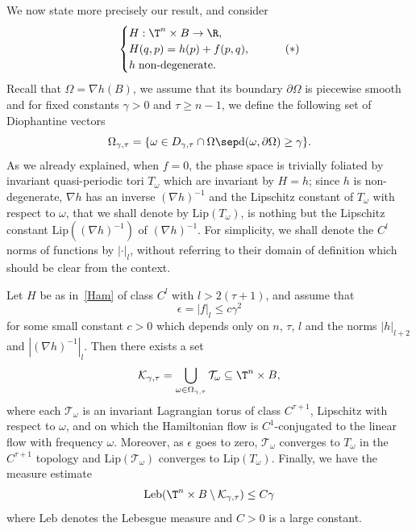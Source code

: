 We now state more precisely our result, and consider
\begin{equation}\label{Ham}
\begin{cases}
H : \T^n \times B \to \R, \\
H(q,p)=h(p)+f(p,q), \\
h \; \mbox{non-degenerate}.
\end{cases}
\tag{$*$}
\end{equation}
Recall that $\Omega=\nabla h(B)$, we assume that its boundary $\partial \Omega$ is piecewise smooth and for fixed constants $\gamma >0$ and $\tau \geq n-1$, we define the following set of Diophantine vectors
\begin{equation*}
\Omega_{\gamma,\tau}=\{\omega \in D_{\gamma,\tau} \cap \Omega \sep \mathrm{d}(\omega,\partial\Omega) \geq \gamma\}.
\end{equation*}
As we already explained, when $f=0$, the phase space is trivially foliated by invariant quasi-periodic tori $T_\omega$ which are invariant by $H=h$; since $h$ is non-degenerate, $\nabla h$ has an inverse $(\nabla h)^{-1}$ and the Lipschitz constant of $T_\omega$ with respect to $\omega$, that we shall denote by $\mathrm{Lip}(T_\omega)$, is nothing but the Lipschitz constant $\mathrm{Lip}((\nabla h)^{-1})$ of $(\nabla h)^{-1}$. For simplicity, we shall denote the $C^l$ norms of functions by $|{\cdot}|_l$, without referring to their domain of definition which should be clear from the context.

\begin{Main}\label{thm1}
Let $H$ be as in~\eqref{Ham} of class $C^l$ with $l>2(\tau+1)$, and assume that
\begin{equation}\label{seuila}
\epsilon=|f|_l \leq c \gamma^2
\end{equation}
for some small constant $c>0$ which depends only on $n$, $\tau$, $l$ and the norms $|h|_{l+2}$ and $|(\nabla h)^{-1}|_{l}$. Then there exists a set
\[ \mathcal{K}_{\gamma,\tau}=\bigcup_{\omega \in \Omega_{\gamma,\tau}}\mathcal{T}_\omega \subseteq \T^n \times B, \]
where each $\mathcal{T}_\omega$ is an invariant Lagrangian torus of class $C^{\tau+1}$, Lipschitz with respect to $\omega$, and on which the Hamiltonian flow is $C^{1}$-conjugated to the linear flow with frequency $\omega$. Moreover, as $\epsilon$ goes to zero, $\mathcal{T}_\omega$ converges to $T_\omega$ in the $C^{\tau+1}$ topology and $\mathrm{Lip}(\mathcal{T}_\omega)$ converges to $\mathrm{Lip}(T_\omega)$. Finally, we have the measure estimate
\[ \mathrm{Leb}(\T^n \times B \setminus \mathcal{K}_{\gamma,\tau}) \leq C\gamma \]
where $ \mathrm{Leb}$ denotes the Lebesgue measure and $C>0$ is a large constant.
\end{Main}

